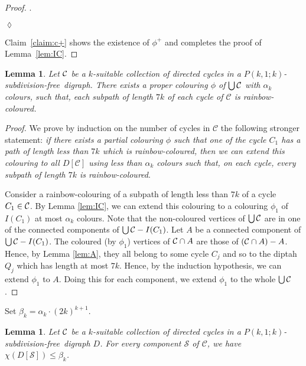 \documentclass[utf8,10pt]{article}
\theoremstyle{plain}
\newtheorem{lemma}[theorem]{Lemma}
\theoremstyle{definition}
\theoremstyle{remark}
\newenvironment{subproof}{\par\noindent {\it Subproof}.\ }{\hfill$\lozenge$\par\vspace{11pt}}
\newcommand{\free}{subdivision-free}
\begin{document}
\begin{proof}
\begin{subproof}
\begin{itemize}
\begin{itemize}
	\end{itemize}
\end{itemize}
\end{subproof}

Claim~\ref{claim:c+} shows the existence of $\phi^+$ and completes the proof of Lemma~\ref{lem:IC}.
\end{proof}




\begin{lemma}\label{lem:col-union-cycle}
Let ${\cal C}$ be a $k$-suitable collection of directed cycles in a $P(k,1;k)$-\free\ digraph.
There exists a proper colouring $\phi$ of $\bigcup{\cal C}$ with $\alpha_k$ colours, such that, each subpath of length $7k$ of each cycle of $\mathcal{C}$ is rainbow-coloured.
\end{lemma}
\begin{proof}
We prove by induction on the number of cycles in $\mathcal{C}$ the following stronger statement:
{\it if there exists
a partial colouring $\phi$ such that one of the cycle $C_1$ has a path of length less than $7k$
which is rainbow-coloured, then we can extend this colouring to all $D[\mathcal{C}]$ using less
than $\alpha_k$ colours such that, on each cycle, every subpath of length
$7k$ is rainbow-coloured}.

Consider a rainbow-colouring of a subpath of length less than $7k$ of a cycle $C_1\in {\cal C}$.
By Lemma \ref{lem:IC}, we can extend this colouring to a colouring $\phi_1$ of $I(C_1)$ at most $\alpha_k$ colours.
Note that the non-coloured vertices of $\bigcup{\cal C}$ are in one of the connected components of $\bigcup{\cal C} - I(C_1)$.
Let $A$ be a connected component of $\bigcup{\cal C} - I(C_1)$. The coloured (by $\phi_1$) vertices of ${\cal C}\cap A$ are those of $({\cal C}\cap A)-A$. Hence, by Lemma \ref{lem:A}, they all belong to some cycle $C_j$ and so to the diptah $Q_j$ which has length at most $7k$.
Hence, by the induction hypothesis, we can extend $\phi_1$ to $A$. Doing this for each component, we extend $\phi_1$ to the whole $\bigcup{\cal C}$.
\end{proof}



Set $\beta_k=\alpha_k \cdot (2k)^{k+1}$.

\begin{lemma}\label{lem:DC}
Let ${\cal C}$ be a $k$-suitable collection of directed cycles in a $P(k,1;k)$-\free\ digraph $D$.
For every component $\mathcal{S}$ of $\mathcal{C}$, we have $\chi(D[\mathcal{S}]) \leq \beta_k$.
\end{lemma}
\end{document}
